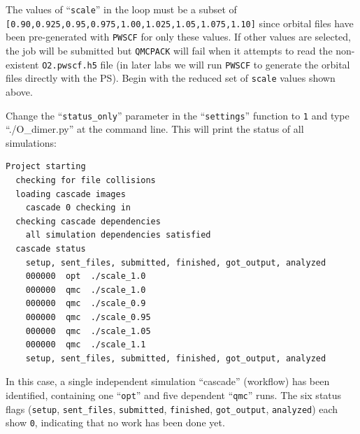 The values of ``\texttt{scale}'' in the loop must be a subset of \newline \texttt{[0.90,0.925,0.95,0.975,1.00,1.025,1.05,1.075,1.10]} since orbital files have been pre-generated with \texttt{PWSCF} for only these values.  If other values are selected, the job will be submitted but \texttt{QMCPACK} will fail when it attempts to read the non-existent \texttt{O2.pwscf.h5} file (in later labs we will run \texttt{PWSCF} to generate the orbital files directly with the PS).  Begin with the reduced set of \texttt{scale} values shown above.

Change the ``\texttt{status\_only}'' parameter in the ``\texttt{settings}'' function to \texttt{1} and type ``./O\_dimer.py'' at the command line.  This will print the status of all simulations:
\begin{shaded}
\begin{verbatim}
Project starting 
  checking for file collisions 
  loading cascade images 
    cascade 0 checking in 
  checking cascade dependencies 
    all simulation dependencies satisfied 
  cascade status 
    setup, sent_files, submitted, finished, got_output, analyzed 
    000000  opt  ./scale_1.0 
    000000  qmc  ./scale_1.0 
    000000  qmc  ./scale_0.9 
    000000  qmc  ./scale_0.95 
    000000  qmc  ./scale_1.05 
    000000  qmc  ./scale_1.1 
    setup, sent_files, submitted, finished, got_output, analyzed 
\end{verbatim}
\end{shaded}
\noindent
In this case, a single independent simulation ``cascade'' (workflow) has been identified, containing one ``\texttt{opt}'' and five dependent ``\texttt{qmc}'' runs.  The six status flags (\texttt{setup}, \texttt{sent\_files}, \texttt{submitted}, \texttt{finished}, \texttt{got\_output}, \texttt{analyzed}) each show \texttt{0}, indicating that no work has been done yet.  

